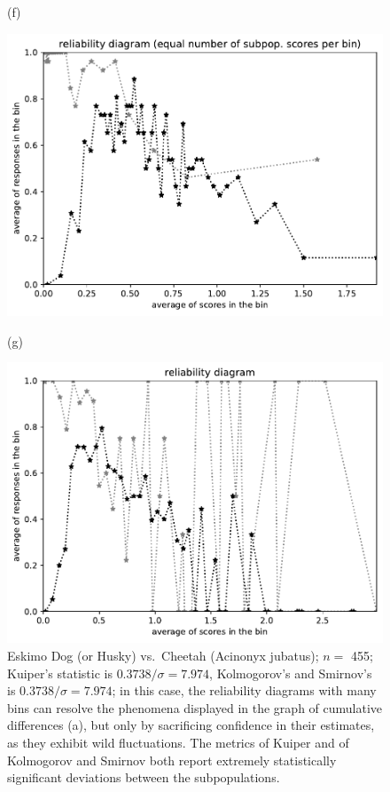 \documentclass{article}
\newlength{\imsize}
\begin{document}
\begin{figure}
\begin{centering}
(f)
\parbox{\imsize}{\includegraphics[width=\imsize]
{../codes/unweighted/nll-1-248-Eskimo-dog-husky_293-cheetah-chetah-Acinonyx-jubatusequisamps50.pdf}}
\quad\quad
(g)
\parbox{\imsize}{\includegraphics[width=\imsize]
{../codes/unweighted/nll-1-248-Eskimo-dog-husky_293-cheetah-chetah-Acinonyx-jubatusequiscore50.pdf}}

\end{centering}
\caption{Eskimo Dog (or Husky) vs.\ Cheetah (Acinonyx jubatus); $n =$ 455;
         Kuiper's statistic is $0.3738 / \sigma = 7.974$,
         Kolmogorov's and Smirnov's is $0.3738 / \sigma = 7.974$;
         in this case, the reliability diagrams with many bins can resolve
         the phenomena displayed in the graph of cumulative differences (a),
         but only by sacrificing confidence in their estimates,
         as they exhibit wild fluctuations.
         The metrics of Kuiper and of Kolmogorov and Smirnov both report
         extremely statistically significant deviations
         between the subpopulations.
}
\label{Eskimo-dog-husky_cheetah}
\end{figure}
\end{document}
